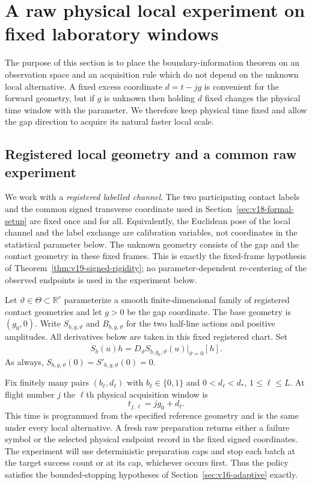 \section{A raw physical local experiment on fixed laboratory windows}
\label{sec:v20-raw-physical}

The purpose of this section is to place the boundary-information theorem on an
observation space and an acquisition rule which do not depend on the unknown
local alternative.  A fixed excess coordinate $d=t-jg$ is convenient for the
forward geometry, but if $g$ is unknown then holding $d$ fixed changes the
physical time window with the parameter.  We therefore keep physical time
fixed and allow the gap direction to acquire its natural faster local scale.

\subsection{Registered local geometry and a common raw experiment}

We work with a \emph{registered labelled channel}.  The two participating
contact labels and the common signed transverse coordinate used in
Section~\ref{sec:v18-formal-setup} are fixed once and for all.  Equivalently,
the Euclidean pose of the local channel and the label exchange are calibration
variables, not coordinates in the statistical parameter below.  The unknown
geometry consists of the gap and the contact geometry in these fixed frames.
This is exactly the fixed-frame hypothesis of
Theorem~\ref{thm:v19-signed-rigidity}; no parameter-dependent re-centering of
the observed endpoints is used in the experiment below.

Let $\vartheta\in\Theta\subset\mathbb R^r$ parameterize a smooth
finite-dimensional family of registered contact geometries and let $g>0$ be
the gap coordinate.  The base geometry is $(g_0,0)$.  Write
$S_{b,g,\vartheta}$ and $B_{b,g,\vartheta}$ for the two half-line actions and
positive amplitudes.  All derivatives below are taken in this fixed registered
chart.  Set
\[
 \dot S_b(u)h=D_\vartheta S_{b,g_0,\vartheta}(u)|_{\vartheta=0}[h].
\]
As always, $S_{b,g,\vartheta}(0)=S'_{b,g,\vartheta}(0)=0$.

Fix finitely many pairs $(b_\ell,d_\ell)$ with
$b_\ell\in\{0,1\}$ and $0<d_\ell<d_*$, $1\le\ell\le L$.  At flight number
$j$ the $\ell$th physical acquisition window is
\begin{equation}\label{eq:v20-fixed-physical-window}
                 t_{j,\ell}=jg_0+d_\ell.
\end{equation}
This time is programmed from the specified reference geometry and is the same
under every local alternative.  A fresh raw preparation returns either a
failure symbol or the selected physical endpoint record in the fixed signed
coordinates.  The experiment will use deterministic preparation caps and
stop each batch at the target success count or at its cap, whichever occurs
first.  Thus the policy satisfies the bounded-stopping hypotheses of
Section~\ref{sec:v16-adaptive} exactly.


